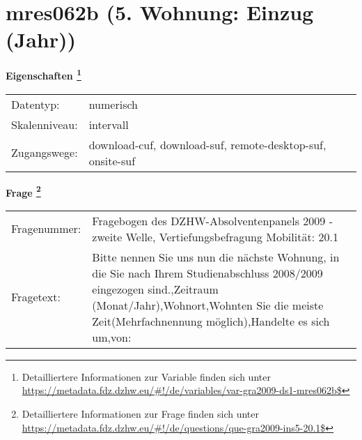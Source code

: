 
    \setcounter{footnote}{0}

    \vspace*{-1.8cm}
	\section{mres062b (5. Wohnung: Einzug (Jahr))}
	\label{section:mres062b}



    \vspace*{0.5cm}
    \noindent\textbf{Eigenschaften
	\footnote{Detailliertere Informationen zur Variable finden sich unter
		\url{https://metadata.fdz.dzhw.eu/\#!/de/variables/var-gra2009-ds1-mres062b$}}}\\
	\begin{tabularx}{\hsize}{@{}lX}
	Datentyp: & numerisch \\
	Skalenniveau: & intervall \\
	Zugangswege: &
	  download-cuf, 
	  download-suf, 
	  remote-desktop-suf, 
	  onsite-suf
 \\
    \end{tabularx}



				\vspace*{0.5cm}
                \noindent\textbf{Frage
	                \footnote{Detailliertere Informationen zur Frage finden sich unter
		              \url{https://metadata.fdz.dzhw.eu/\#!/de/questions/que-gra2009-ins5-20.1$}}}\\
				\begin{tabularx}{\hsize}{@{}lX}
					Fragenummer: &
					  Fragebogen des DZHW-Absolventenpanels 2009 - zweite Welle, Vertiefungsbefragung Mobilität:
					  20.1
 \\
					Fragetext: & Bitte nennen Sie uns nun die nächste Wohnung, in die Sie nach Ihrem Studienabschluss 2008/2009 eingezogen sind.,Zeitraum (Monat/Jahr),Wohnort,Wohnten Sie die meiste Zeit(Mehrfachnennung möglich),Handelte es sich um,von: \\
				\end{tabularx}





